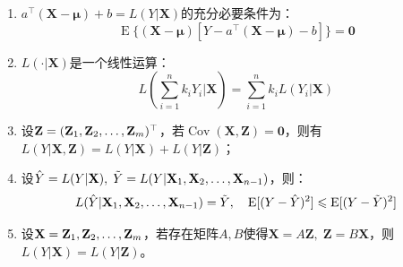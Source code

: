 \begin{property}
\begin{enumerate}
		\item
		$a^{\top}(\mathbf{X}-\boldsymbol{\mu})+b=L(Y|\mathbf{X})$的充分必要条件为：
		\begin{equation*}
			\operatorname{E}\{(\mathbf{X}-\boldsymbol{\mu})[Y-a^{\top}(\mathbf{X}-\boldsymbol{\mu})-b]\}=\mathbf{0}
		\end{equation*}
		\item $L(\cdot|\mathbf{X})$是一个线性运算：
		\begin{equation*}
			L\left(\sum_{i=1}^{n}k_iY_i|\mathbf{X}\right)=\sum_{i=1}^{n}k_iL(Y_i|\mathbf{X})
		\end{equation*}
		\item 设$\mathbf{Z}=(\mathbf{Z}_1, \mathbf{Z}_2, \dots, \mathbf{Z}_{m})^{\top}$，若$\operatorname{Cov}(\mathbf{X},\mathbf{Z})=\mathbf{0}$，则有$L(Y|\mathbf{X},\mathbf{Z})=L(Y|\mathbf{X})+L(Y|\mathbf{Z})$；
		\item 设$\hat{Y}=L(Y|\mathbf{X}),\;\tilde{Y}=L(Y|\mathbf{X}_1, \mathbf{X}_2, \dots, \mathbf{X}_{n-1})$，则：
		\begin{equation*}
			L(\hat{Y}|\mathbf{X}_1, \mathbf{X}_2, \dots, \mathbf{X}_{n-1})=\tilde{Y},\quad\operatorname{E}[(Y-\hat{Y})^2]\leqslant\operatorname{E}[(Y-\tilde{Y})^2]
		\end{equation*}
		\item 设$\mathbf{X}=\mathbf{Z}_1, \mathbf{Z}_2, \dots, \mathbf{Z}_{m}$，若存在矩阵$A,B$使得$\mathbf{X}=A\mathbf{Z},\;\mathbf{Z}=B\mathbf{X}$，则$L(Y|\mathbf{X})=L(Y|\mathbf{Z})$。
	\end{enumerate}
\end{property}
